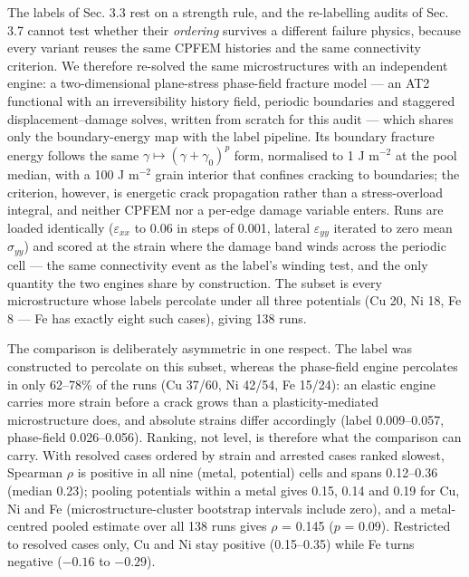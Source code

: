 \documentclass[11pt]{article}
\begin{document}
The labels of Sec. 3.3 rest on a strength rule, and the re-labelling audits of Sec. 3.7 cannot test whether their \textit{ordering} survives a different failure physics, because every variant reuses the same CPFEM histories and the same connectivity criterion. We therefore re-solved the same microstructures with an independent engine: a two-dimensional plane-stress phase-field fracture model --- an AT2 functional with an irreversibility history field, periodic boundaries and staggered displacement--damage solves, written from scratch for this audit --- which shares only the boundary-energy map with the label pipeline. Its boundary fracture energy follows the same $\gamma \mapsto (\gamma+\gamma_0)^{p}$ form, normalised to 1 J m$^{-2}$ at the pool median, with a 100 J m$^{-2}$ grain interior that confines cracking to boundaries; the criterion, however, is energetic crack propagation rather than a stress-overload integral, and neither CPFEM nor a per-edge damage variable enters. Runs are loaded identically ($\varepsilon_{xx}$ to 0.06 in steps of 0.001, lateral $\varepsilon_{yy}$ iterated to zero mean $\sigma_{yy}$) and scored at the strain where the damage band winds across the periodic cell --- the same connectivity event as the label's winding test, and the only quantity the two engines share by construction. The subset is every microstructure whose labels percolate under all three potentials (Cu 20, Ni 18, Fe 8 --- Fe has exactly eight such cases), giving 138 runs.

The comparison is deliberately asymmetric in one respect. The label was constructed to percolate on this subset, whereas the phase-field engine percolates in only 62--78\% of the runs (Cu 37/60, Ni 42/54, Fe 15/24): an elastic engine carries more strain before a crack grows than a plasticity-mediated microstructure does, and absolute strains differ accordingly (label 0.009--0.057, phase-field 0.026--0.056). Ranking, not level, is therefore what the comparison can carry. With resolved cases ordered by strain and arrested cases ranked slowest, Spearman $\rho$ is positive in all nine (metal, potential) cells and spans 0.12--0.36 (median 0.23); pooling potentials within a metal gives 0.15, 0.14 and 0.19 for Cu, Ni and Fe (microstructure-cluster bootstrap intervals include zero), and a metal-centred pooled estimate over all 138 runs gives $\rho$ = 0.145 ($p$ = 0.09). Restricted to resolved cases only, Cu and Ni stay positive (0.15--0.35) while Fe turns negative ($-0.16$ to $-0.29$).
\end{document}
